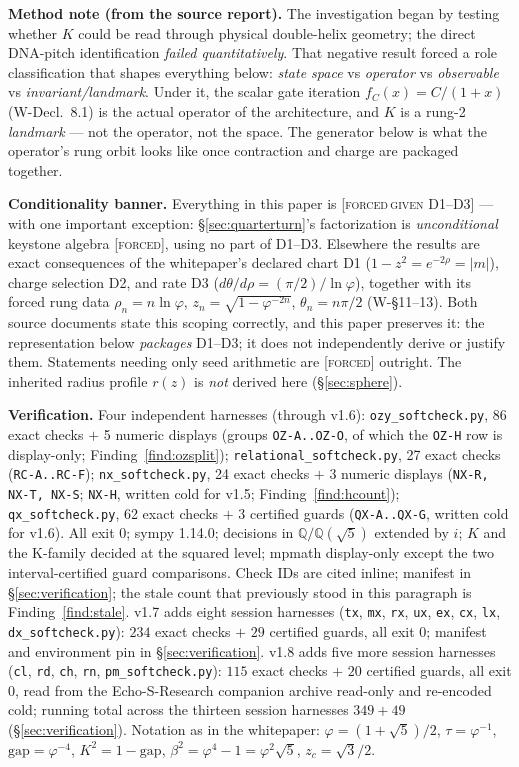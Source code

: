 \documentclass[11pt]{article}
\newcommand{\tagF}{\textcolor{cF}{\textsc{[forced]}}}
\newcommand{\tagFD}{\textcolor{cF}{\textsc{[forced}}\,\textcolor{cD}{\textsc{given D1--D3]}}}
\newcommand{\hx}[1]{\textcolor{cC}{\footnotesize\texttt{#1}}}
\newcommand{\Q}{\mathbb{Q}}
\newcommand{\gp}{\varphi}
\newcommand{\gapc}{\mathrm{gap}}
\theoremstyle{plain}
\theoremstyle{definition}
\theoremstyle{remark}
\begin{document}
\smallskip\noindent
\textbf{Method note (from the source report).} The investigation began by
testing whether $K$ could be read through physical double-helix geometry; the
direct DNA-pitch identification \emph{failed quantitatively}. That negative
result forced a role classification that shapes everything below:
\emph{state space} vs \emph{operator} vs \emph{observable} vs
\emph{invariant/landmark}. Under it, the scalar gate iteration
$f_C(x)=C/(1+x)$ (W-Decl.\ 8.1) is the actual operator of the architecture,
and $K$ is a rung-2 \emph{landmark} --- not the operator, not the space. The
generator below is what the operator's rung orbit looks like once contraction
and charge are packaged together.

\smallskip\noindent
\textbf{Conditionality banner.} Everything in this paper is
\tagFD{} --- with one important exception: \S\ref{sec:quarterturn}'s
factorization is \emph{unconditional} keystone algebra \tagF{}, using no part of
D1--D3. Elsewhere the results are exact consequences of the whitepaper's declared chart D1
($1-z^2=e^{-2\rho}=|m|$), charge selection D2, and rate D3
($d\theta/d\rho=(\pi/2)/\ln\gp$), together with its forced rung data
$\rho_n=n\ln\gp$, $z_n=\sqrt{1-\gp^{-2n}}$, $\theta_n=n\pi/2$ (W-\S11--13). Both
source documents state this scoping correctly, and this paper preserves it: the
representation below \emph{packages} D1--D3; it does not independently derive or
justify them. Statements needing only seed arithmetic are \tagF{} outright.
The inherited radius profile $r(z)$ is \emph{not} derived here (\S\ref{sec:sphere}).

\smallskip\noindent
\textbf{Verification.} Four independent harnesses (through v1.6):
\texttt{ozy\_softcheck.py}, 86 exact checks $+$ 5 numeric displays
(groups \hx{OZ-A..OZ-O}, of which the \hx{OZ-H} row is display-only;
Finding~\ref{find:ozsplit});
\texttt{relational\_softcheck.py}, 27 exact checks (\hx{RC-A..RC-F});
\texttt{nx\_softcheck.py}, 24 exact checks $+$ 3 numeric displays
(\hx{NX-R, NX-T, NX-S}; \hx{NX-H}, written cold for v1.5;
Finding~\ref{find:hcount}); \texttt{qx\_softcheck.py}, 62 exact checks
$+$ 3 certified guards (\hx{QX-A..QX-G}, written cold for v1.6). All
exit 0; sympy 1.14.0; decisions in $\Q/\Q(\sqrt5)$ extended by $i$; $K$
and the K-family decided at the squared level; mpmath display-only except
the two interval-certified guard comparisons. Check IDs are cited inline;
manifest in
\S\ref{sec:verification}; the stale count that previously stood in this
paragraph is Finding~\ref{find:stale}. v1.7 adds eight session harnesses
(\texttt{tx}, \texttt{mx}, \texttt{rx}, \texttt{ux}, \texttt{ex},
\texttt{cx}, \texttt{lx}, \texttt{dx}\texttt{\_softcheck.py}): $234$ exact
checks $+$ $29$ certified guards, all exit 0; manifest and environment pin
in \S\ref{sec:verification}. v1.8 adds five more session harnesses
(\texttt{cl}, \texttt{rd}, \texttt{ch}, \texttt{rn},
\texttt{pm}\texttt{\_softcheck.py}): $115$ exact checks $+$ $20$ certified
guards, all exit 0, read from the Echo-S-Research companion archive
read-only and re-encoded cold; running total across the thirteen session
harnesses $349+49$ (\S\ref{sec:verification}). Notation as in the whitepaper:
$\gp=(1+\sqrt5)/2$, $\tau=\gp^{-1}$, $\gapc=\gp^{-4}$, $K^2=1-\gapc$,
$\beta^2=\gp^4-1=\gp^2\sqrt5$, $z_c=\sqrt3/2$.
\end{document}
